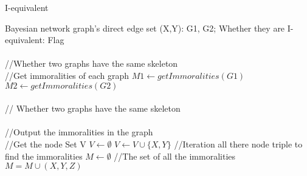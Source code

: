 \documentclass[twoside]{article}
\begin{document}
\begin{algorithm}  
        \caption{I-equivalent}  
        \begin{algorithmic}[1]  
            \Require Bayesian network graph's direct edge set {(X,Y)}: G1, G2;  
            \Ensure Whether they are I-equivalent: Flag  \\
            \\
            	//Whether two graphs have the same skeleton
                	\State {}
                \EndIf\\
                //Get immoralities of each graph
                \State $M1\gets getImmoralities(G1)$
                \State $M2\gets getImmoralities(G2)$
                	\State {}
                \EndIf
                \State {}
            \EndFunction\\
            \\
            
            // Whether two graphs have the same skeleton
                	\State {}
                \EndIf
                		\State {}
                	\EndIf
                \EndFor
                \State {}
            \EndFunction\\
            \\
            //Output the immoralities in the graph
            \\
			//Get the node Set V
				\State $V \gets \emptyset$
					\State $V\gets V\cup\{X,Y\}$
                \EndFor
            //Iteration all there node triple to find the immoralities
            	\State $M\gets \emptyset$ //The set of all the immoralities
            						\State $M=M\cup(X,Y,Z)$
            					\EndIf					
            				\EndIf
            			\EndFor
            		\EndFor
            	\EndFor
            	\State {}
            \EndFunction
        \end{algorithmic}  
    \end{algorithm} 
\end{document}
